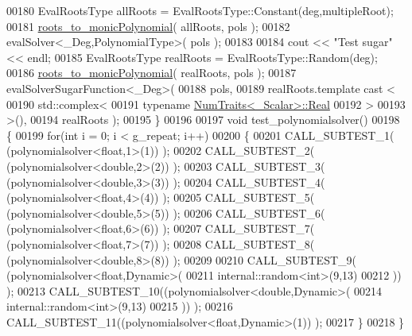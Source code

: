 \begin{DoxyCode}
00180   EvalRootsType allRoots = EvalRootsType::Constant(deg,multipleRoot);
00181   \hyperlink{namespace_eigen_afbc3648f7ef67db3d5d04454fc1257fd}{roots\_to\_monicPolynomial}( allRoots, pols );
00182   evalSolver<\_Deg,PolynomialType>( pols );
00183 
00184   cout << \textcolor{stringliteral}{"Test sugar"} << endl;
00185   EvalRootsType realRoots = EvalRootsType::Random(deg);
00186   \hyperlink{namespace_eigen_afbc3648f7ef67db3d5d04454fc1257fd}{roots\_to\_monicPolynomial}( realRoots, pols );
00187   evalSolverSugarFunction<\_Deg>(
00188       pols,
00189       realRoots.template cast <
00190                     std::complex<
00191                          \textcolor{keyword}{typename} \hyperlink{group___sparse_core___module}{NumTraits<\_Scalar>::Real}
00192                          >
00193                     >(),
00194       realRoots );
00195 \}
00196 
00197 \textcolor{keywordtype}{void} test\_polynomialsolver()
00198 \{
00199   \textcolor{keywordflow}{for}(\textcolor{keywordtype}{int} i = 0; i < g\_repeat; i++)
00200   \{
00201     CALL\_SUBTEST\_1( (polynomialsolver<float,1>(1)) );
00202     CALL\_SUBTEST\_2( (polynomialsolver<double,2>(2)) );
00203     CALL\_SUBTEST\_3( (polynomialsolver<double,3>(3)) );
00204     CALL\_SUBTEST\_4( (polynomialsolver<float,4>(4)) );
00205     CALL\_SUBTEST\_5( (polynomialsolver<double,5>(5)) );
00206     CALL\_SUBTEST\_6( (polynomialsolver<float,6>(6)) );
00207     CALL\_SUBTEST\_7( (polynomialsolver<float,7>(7)) );
00208     CALL\_SUBTEST\_8( (polynomialsolver<double,8>(8)) );
00209 
00210     CALL\_SUBTEST\_9( (polynomialsolver<float,Dynamic>(
00211             internal::random<int>(9,13)
00212             )) );
00213     CALL\_SUBTEST\_10((polynomialsolver<double,Dynamic>(
00214             internal::random<int>(9,13)
00215             )) );
00216     CALL\_SUBTEST\_11((polynomialsolver<float,Dynamic>(1)) );
00217   \}
00218 \}
\end{DoxyCode}
